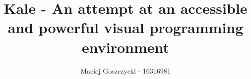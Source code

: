 \documentclass[11pt]{report}
\title{Kale - An attempt at an accessible and powerful visual programming
environment}
\author{Maciej Goszczycki - 16316981}
\date{}
\begin{document}
\maketitle
\tableofcontents
\clearpage
{}
\setcounter{page}{1}
\setlength\intextsep{0pt}

\DefineShortVerb{\|}











\renewcommand*{\bibfont}{\raggedright}



\begin{appendices}
	
\end{appendices}
\end{document}
